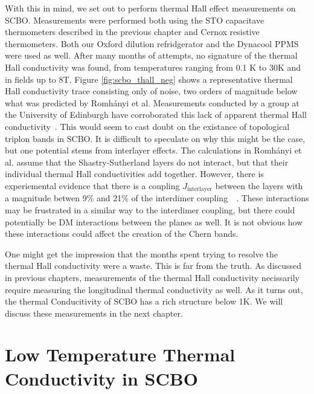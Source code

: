\documentclass{thesis-umich}
\begin{document}
With this in mind, we set out to perform thermal Hall effect measurements on SCBO. Measurements were performed both using the STO capacitave thermometers described in the previous chapter and Cernox resistive thermometers. Both our Oxford dilution refridgerator and the Dynacool PPMS were used as well. After many months of attempts, no signature of the thermal Hall conductivity was found, from temperatures ranging from 0.1 K to 30K and in fields up to 8T. Figure \ref{fig:scbo_thall_neg} shows a representative thermal Hall conductivity trace consisting only of noise, two orders of magnitude below what was predicted by Romh\'{a}nyi et al. Measurements conducted by a group at the University of Edinburgh have corroborated this lack of apparent thermal Hall conductivity~\cite{CairnsMarchMeeting}. This would seem to cast doubt on the existance of topological triplon bands in SCBO. It is difficult to speculate on why this might be the case, but one potential stems from interlayer effects. The calculations in Romh\'{a}nyi et al. assume that the Shastry-Sutherland layers do not interact, but that their individual thermal Hall conductivities add together. However, there is experiemental evidence that there is a coupling $J_{\mathrm{interlayer}}$ between the layers with a magnitude betwen 9\% and 21\% of the interdimer coupling~\cite{Miyahara2000}~\cite{Knetter2000}. These interactions may be frustrated in a similar way to the interdimer coupling, but there could potentially be DM interactions between the planes as well. It is not obvious how these interactions could affect the creation of the Chern bands.

One might get the impression that the months spent trying to resolve the thermal Hall conductivity were a waste. This is far from the truth. As discussed in previous chapters, measurements of the thermal Hall conductivity necissarily require measuring the longitudinal thermal conductivity as well. As it turns out, the thermal Conducitivity of SCBO has a rich structure below 1K. We will discuss these measurements in the next chapter.

\section{Low Temperature Thermal Conductivity in SCBO}
\end{document}
